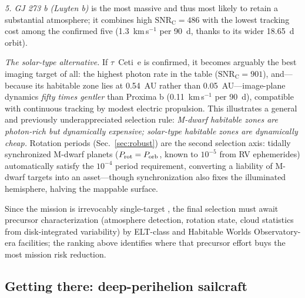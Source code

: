 ﻿\documentclass[twocolumn]{emulateapj}
\begin{document}
{\it 5. GJ 273 b (Luyten b)} is the most massive and thus most likely
to retain a substantial atmosphere; it combines high
$\mathrm{SNR_C}=486$ with the lowest tracking cost among the confirmed
five (1.3~km\,s$^{-1}$ per 90~d, thanks to its wider 18.65~d orbit).

{\it The solar-type alternative.} If $\tau$~Ceti~e is confirmed, it
becomes arguably the best imaging target of all: the highest photon
rate in the table ($\mathrm{SNR_C}=901$), and---because its habitable
zone lies at 0.54~AU rather than 0.05~AU---image-plane dynamics
{\it fifty times gentler} than Proxima b (0.11~km\,s$^{-1}$ per 90~d),
compatible with continuous tracking by modest electric propulsion. This
illustrates a general and previously underappreciated selection rule:
{\it M-dwarf habitable zones are photon-rich but dynamically expensive;
solar-type habitable zones are dynamically cheap.} Rotation periods
(Sec.~\ref{sec:robust}) are the second selection axis: tidally
synchronized M-dwarf planets ($P_{\rm rot}=P_{\rm orb}$, known to
$10^{-5}$ from RV ephemerides) automatically satisfy the $10^{-4}$
period requirement, converting a liability of M-dwarf targets into an
asset---though synchronization also fixes the illuminated hemisphere,
halving the mappable surface.

Since the mission is irrevocably single-target \citep{tur26uhr}, the
final selection must await precursor characterization (atmosphere
detection, rotation state, cloud statistics from disk-integrated
variability) by ELT-class and Habitable Worlds Observatory-era
facilities; the ranking above identifies where that precursor effort
buys the most mission risk reduction.

\subsection{Getting there: deep-perihelion sailcraft}
\label{sec:sail}
\end{document}
